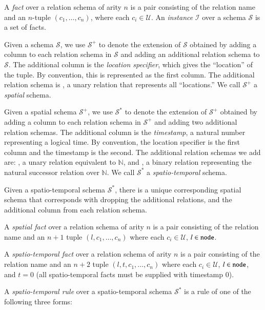 
A {\em fact} over a relation schema of arity $n$ is a pair consisting of the
relation name and an $n$-tuple $(c_1,\ldots,c_n)$, where each $c_i \in
\mathcal{U}$.  An \emph{instance} $\mathcal{I}$ over a schema $\mathcal{S}$ is a
set of facts.

  Given a schema $\mathcal{S}$, we use
$\mathcal{S}^+$ to denote the extension of $\mathcal{S}$ obtained by adding a
column to each relation schema in $\mathcal{S}$ and adding an additional
relation schema to $\mathcal{S}$.  The additional column is the {\em location
  specifier}, which gives the ``location'' of the tuple.  By convention, this is
represented as the first column.  The additional relation schema is , a
unary relation that represents all ``locations.''  We call $\mathcal{S}^+$ a
{\em spatial} schema.

Given a spatial schema $\mathcal{S}^+$, we use $\mathcal{S}^*$ to denote the
extension of $\mathcal{S}^+$ obtained by adding a column to each relation schema
in $\mathcal{S}^+$ and adding two additional relation schemas.  The additional
column is the {\em timestamp}, a natural number representing a logical time.  By
convention, the location specifier is the first column and the timestamp is the
second.  The additional relation schemas we add are: , a unary
relation equivalent to $\mathbb{N}$, and , a binary relation
representing the natural successor relation over $\mathbb{N}$.  We call
$\mathcal{S}^*$ a {\em spatio-temporal} schema.

Given a spatio-temporal schema $\mathcal{S}^*$, there is a unique corresponding spatial schema that corresponds with dropping the additional relations, and the additional column from each relation schema.

A {\em spatial fact} over a relation schema of arity $n$ is a pair consisting of the relation name and an $n+1$ tuple $(l,c_1,\ldots,c_n)$ where each $c_i \in \mathcal{U}$, $l \in \dedalus{node}$.

A {\em spatio-temporal fact} over a relation schema of arity $n$ is a pair consisting of the relation name and an $n+2$ tuple $(l,t,c_1,\ldots,c_n)$ where each $c_i \in \mathcal{U}$, $l \in \dedalus{node}$, and $t = 0$ (all spatio-temporal facts must be supplied with timestamp 0).

A {\em spatio-temporal rule} over a spatio-temporal schema $\mathcal{S}^*$ is a rule of one of the following three forms:

